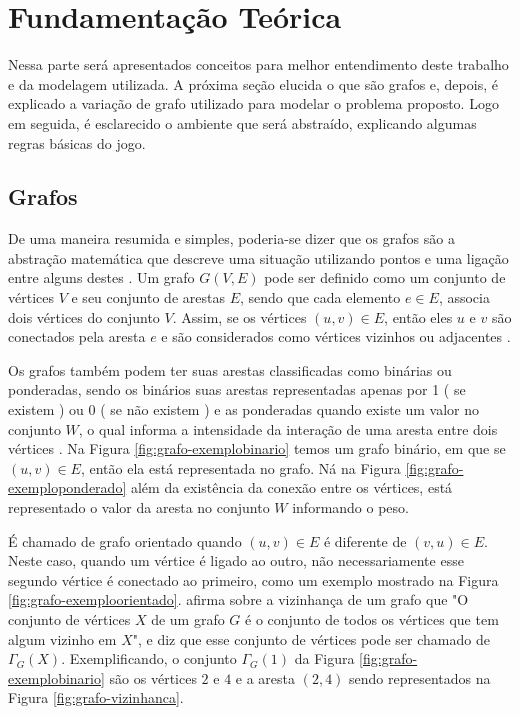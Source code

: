 \chapter{Fundamentação Teórica}
\label{chap:fundteorica}
Nessa parte será apresentados conceitos para melhor entendimento deste trabalho e da modelagem utilizada. 
A próxima seção elucida o que são grafos e, depois, é explicado a variação de grafo utilizado para modelar o problema proposto. Logo em seguida, é esclarecido o ambiente que será abstraído, explicando algumas regras básicas do jogo.
\section{Grafos}
\label{chap:grafos}

De uma maneira resumida e simples, poderia-se dizer que os grafos são a abstração matemática que descreve uma situação utilizando pontos e uma ligação entre alguns destes \cite{Lucchesi1979}.
Um grafo \(G(V, E)\) pode ser definido como um conjunto de vértices \(V\) e seu conjunto de arestas \(E\), sendo que cada elemento \(e \in E\), associa dois vértices do conjunto \(V\). Assim, se os vértices \((u,v) \in E\), então eles \(u\) e \(v\) são conectados pela aresta \(e\) e são considerados como vértices vizinhos ou adjacentes \cite{grafosucinto, Viana2007}.

Os grafos também podem ter suas arestas classificadas como binárias ou ponderadas, sendo os binários suas arestas representadas apenas por 1 ( se existem ) ou 0 ( se não existem ) e as ponderadas quando existe um valor no conjunto \(W\), o qual informa a intensidade da interação de uma aresta entre dois vértices  \cite{Viana2007, cormen6}.
Na Figura \ref{fig:grafo-exemplobinario} temos um grafo binário,  em que se \((u,v) \in E\), então ela está representada no grafo. Ná na Figura \ref{fig:grafo-exemploponderado} além da existência da conexão entre os vértices, está representado o valor da aresta no conjunto \(W\) informando o peso. 

É chamado de grafo orientado quando \((u,v) \in E\) é diferente de \((v,u) \in E\). Neste caso, quando um vértice é ligado ao outro, não necessariamente esse segundo vértice é conectado ao primeiro, como um exemplo mostrado na Figura \ref{fig:grafo-exemploorientado}.
\citet{grafosucinto} afirma sobre a vizinhança de um grafo que "O conjunto de vértices \(X\) de um grafo \(G\) é o conjunto de todos os vértices que tem algum vizinho em \(X\)", e diz que esse conjunto de vértices pode ser chamado de \(\Gamma_G(X)\). Exemplificando, o conjunto \(\Gamma_G(1)\) da Figura \ref{fig:grafo-exemplobinario} são os vértices \(2\) e \(4\) e a aresta \( (2,4) \) sendo representados na Figura \ref{fig:grafo-vizinhanca}.

